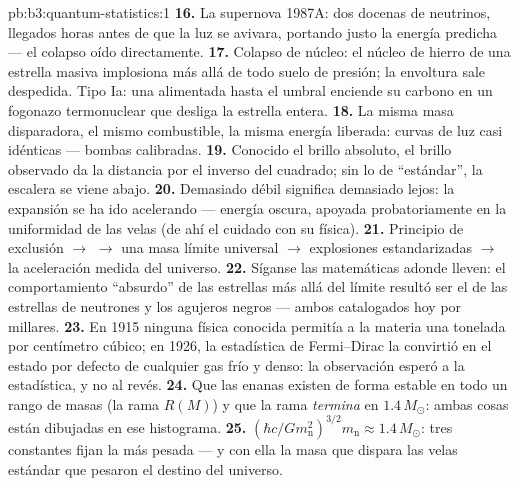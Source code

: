 \begin{solution}{pb:b3:quantum-statistics:1}
\textbf{16.} La supernova 1987A: dos docenas de neutrinos, llegados horas
antes de que la luz se avivara, portando justo la energía predicha
--- el colapso oído directamente.
\textbf{17.} Colapso de núcleo: el núcleo de hierro de una estrella masiva
implosiona más allá de todo suelo de presión; la envoltura sale despedida. Tipo
Ia: una  alimentada hasta el umbral enciende su carbono en un
fogonazo termonuclear que desliga la estrella entera.
\textbf{18.} La misma masa disparadora, el mismo combustible, la misma
energía liberada: curvas de luz casi idénticas --- bombas calibradas.
\textbf{19.} Conocido el brillo absoluto, el brillo observado
da la distancia por el inverso del cuadrado; sin
lo de ``estándar'', la escalera se viene abajo.
\textbf{20.} Demasiado débil significa demasiado lejos: la expansión se ha ido
acelerando --- energía oscura, apoyada probatoriamente en la
uniformidad de las velas (de ahí el cuidado con su física).
\textbf{21.} Principio de exclusión $\to$  $\to$ una
masa límite universal $\to$ explosiones estandarizadas $\to$ la
aceleración medida del universo.
\textbf{22.} Síganse las matemáticas adonde lleven: el
comportamiento ``absurdo'' de las estrellas más allá del límite resultó ser
el de las estrellas de neutrones y los agujeros negros --- ambos catalogados
hoy por millares.
\textbf{23.} En 1915 ninguna física conocida permitía a la materia una
tonelada por centímetro cúbico; en 1926, la estadística de Fermi--Dirac la
convirtió en el estado por defecto de cualquier gas frío y denso: la
observación esperó a la estadística, y no al revés.
\textbf{24.} Que las enanas existen de forma estable en todo un rango de masas
(la rama $R(M)$) y que la rama \emph{termina} en
$1.4\,M_\odot$: ambas cosas están dibujadas en ese histograma.
\textbf{25.} $(\hbar c/Gm_{\text{n}}^2)^{3/2}m_{\text{n}} \approx
1.4\,M_\odot$: tres constantes fijan la  más pesada ---
y con ella la masa que dispara las velas estándar que pesaron
el destino del universo.
\end{solution}
